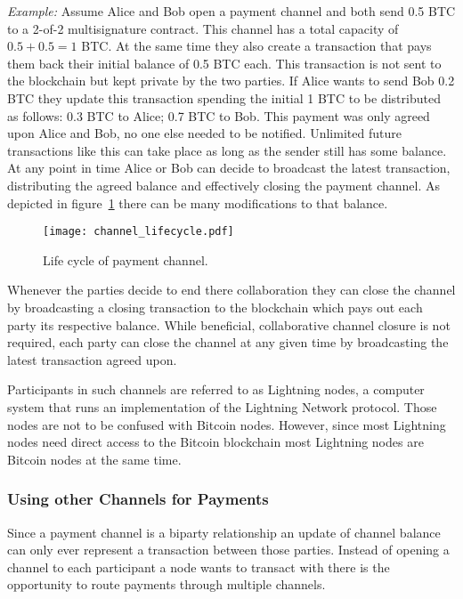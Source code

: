 \documentclass[final]{fhnwreport}       %
\begin{document}
\textit{Example:} Assume Alice and Bob open a payment channel and both send 0.5 BTC to a 2-of-2 multisignature contract. This channel has a total capacity of $0.5 + 0.5 = 1$ BTC. At the same time they also create a transaction that pays them back their initial balance of 0.5 BTC each. This transaction is not sent to the \gls{blockchain} but kept private by the two parties. If Alice wants to send Bob 0.2 BTC they update this transaction spending the initial 1 BTC to be distributed as follows: 0.3 BTC to Alice; 0.7 BTC to Bob. This payment was only agreed upon Alice and Bob, no one else needed to be notified. Unlimited future transactions like this can take place as long as the sender still has some balance. At any point in time Alice or Bob can decide to broadcast the latest transaction, distributing the agreed balance and effectively closing the payment channel. As depicted in figure~\ref{fig:ChannelCycle} there can be many modifications to that balance.

\begin{figure}[H]
\centering
\texttt{[image: channel\_lifecycle.pdf]}
\caption{Life cycle of payment channel.}
\label{fig:ChannelCycle}
\end{figure}

Whenever the parties decide to end there collaboration they can close the channel by broadcasting a closing transaction to the \gls{blockchain} which pays out each party its respective balance. While beneficial, collaborative channel closure is not required, each party can close the channel at any given time by broadcasting the latest transaction agreed upon. 

Participants in such channels are referred to as Lightning nodes, a computer system that runs an implementation of the Lightning Network protocol. Those nodes are not to be confused with Bitcoin nodes. However, since most Lightning nodes need direct access to the Bitcoin \gls{blockchain} most Lightning nodes are Bitcoin nodes at the same time.

\subsubsection{Using other Channels for Payments}
Since a payment channel is a biparty relationship an update of channel balance can only ever represent a transaction between those parties. Instead of opening a channel to each participant a node wants to transact with there is the opportunity to route payments through multiple channels.
\end{document}
